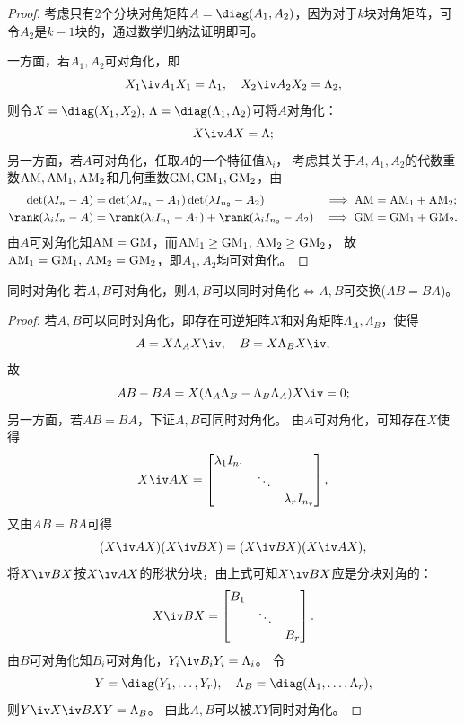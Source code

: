 \begin{proof}
	考虑只有2个分块对角矩阵$A=\diag(A_1,A_2)$，因为对于$k$块对角矩阵，可令$A_2$是$k-1$块的，通过数学归纳法证明即可。

	一方面，若$A_1,A_2$可对角化，即
	\[
		X_1\iv A_1X_1=\Lambda_1,\quad X_2\iv A_2X_2=\Lambda_2,
	\]
	则令$X=\diag(X_1,X_2),\,\Lambda=\diag(\Lambda_1,\Lambda_2)$可将$A$对角化：
	\[
		X\iv AX=\Lambda;
	\]
	另一方面，若$A$可对角化，任取$A$的一个特征值$\lambda_i$，
	考虑其关于$A,A_1,A_2$的代数重数$\mathrm{AM},\mathrm{AM}_1,\mathrm{AM}_2$和几何重数$\mathrm{GM},\mathrm{GM}_1,\mathrm{GM}_2$，由
	\begin{alignat*}{2}
		\det(\lambda I_n-A)&=\det(\lambda I_{n_1}-A_1)\det(\lambda I_{n_2}-A_2)&\implies\AM&=\AM_1+\AM_2;\\
		\rank(\lambda_iI_n-A)&=\rank(\lambda_iI_{n_1}-A_1)+\rank(\lambda_iI_{n_2}-A_2)&\implies\GM&=\GM_1+\GM_2.
	\end{alignat*}
	由$A$可对角化知$\mathrm{AM}=\mathrm{GM}$，而$\mathrm{AM}_1\geq\mathrm{GM}_1,\,\mathrm{AM}_2\geq\mathrm{GM}_2$，
	故$\mathrm{AM}_1=\mathrm{GM}_1,\,\mathrm{AM}_2=\mathrm{GM}_2$，即$A_1,A_2$均可对角化。
\end{proof}

\begin{theorem}{同时对角化}{}
	若$A,B$可对角化，则$A,B$可以同时对角化$\iff A,B$可交换($AB=BA$)。
\end{theorem}

\begin{proof}
	若$A,B$可以同时对角化，即存在可逆矩阵$X$和对角矩阵$\Lambda_A,\Lambda_B$，使得
	\[
		A=X\Lambda_AX\iv,\quad B=X\Lambda_BX\iv,
	\]
	故
	\[
		AB-BA=X(\Lambda_A\Lambda_B-\Lambda_B\Lambda_A)X\iv=0;
	\]
	另一方面，若$AB=BA$，下证$A,B$可同时对角化。
	由$A$可对角化，可知存在$X$使得
	\[
		X\iv AX=\begin{bmatrix}
			\lambda_1I_{n_1}\\ &\ddots\\ &&\lambda_rI_{n_r}
		\end{bmatrix},
	\]
	又由$AB=BA$可得
	\[
		(X\iv AX)(X\iv BX)=(X\iv BX)(X\iv AX),
	\]
	将$X\iv BX$按$X\iv AX$的形状分块，由上式可知$X\iv BX$应是分块对角的：
	\[
		X\iv BX=\begin{bmatrix}
			B_1\\ &\ddots\\ &&B_r
		\end{bmatrix}.
	\]
	由$B$可对角化知$B_i$可对角化，$Y_i\iv B_iY_i=\Lambda_i$。
	令
	\[
		Y=\diag(Y_1,\ldots,Y_r),
		\quad
		\Lambda_B=\diag(\Lambda_1,\ldots,\Lambda_r),
	\]
	则$Y\iv X\iv BXY=\Lambda_B$。
	由此$A,B$可以被$XY$同时对角化。
\end{proof}

